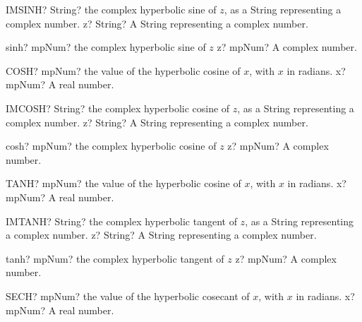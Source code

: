 \documentclass[12pt,a4paper,openany]{book}
\begin{document}
\begin{mpFunctionsExtract}
\mpWorksheetFunctionOneNotImplemented
{IMSINH? String? the complex hyperbolic sine of $z$, as a String representing a complex number.}
{z? String? A String representing a complex number.}
\end{mpFunctionsExtract}

\begin{mpFunctionsExtract}
\mpFunctionOne
{sinh? mpNum? the complex hyperbolic sine of $z$}
{z? mpNum? A complex number.}
\end{mpFunctionsExtract}

\begin{mpFunctionsExtract}
\mpWorksheetFunctionOneNotImplemented
{COSH? mpNum? the value of the hyperbolic cosine of $x$, with $x$ in radians.}
{x? mpNum? A real number.}
\end{mpFunctionsExtract}

\begin{mpFunctionsExtract}
\mpWorksheetFunctionOneNotImplemented
{IMCOSH? String? the complex hyperbolic cosine of $z$, as a String representing a complex number.}
{z? String? A String representing a complex number.}
\end{mpFunctionsExtract}

\begin{mpFunctionsExtract}
\mpFunctionOne
{cosh? mpNum? the complex hyperbolic cosine of $z$}
{z? mpNum? A complex number.}
\end{mpFunctionsExtract}

\begin{mpFunctionsExtract}
\mpWorksheetFunctionOneNotImplemented
{TANH? mpNum? the value of the hyperbolic cosine of $x$, with $x$ in radians.}
{x? mpNum? A real number.}
\end{mpFunctionsExtract}

\begin{mpFunctionsExtract}
\mpWorksheetFunctionOneNotImplemented
{IMTANH? String? the complex hyperbolic tangent of $z$, as a String representing a complex number.}
{z? String? A String representing a complex number.}
\end{mpFunctionsExtract}

\begin{mpFunctionsExtract}
\mpFunctionOne
{tanh? mpNum? the complex hyperbolic tangent of $z$}
{z? mpNum? A complex number.}
\end{mpFunctionsExtract}

\begin{mpFunctionsExtract}
\mpWorksheetFunctionOneNotImplemented
{SECH? mpNum? the value of the hyperbolic cosecant of $x$, with $x$ in radians.}
{x? mpNum? A real number.}
\end{mpFunctionsExtract}
\end{document}
